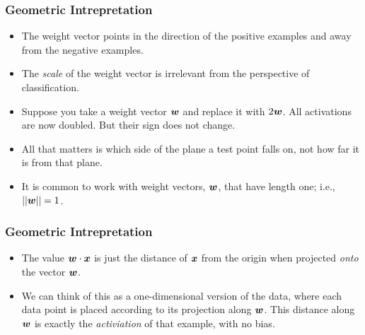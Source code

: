 \documentclass[trans]{beamer}
\begin{document}
\begin{frame}
  \frametitle{Geometric Intrepretation}
\begin{itemize}
\item
 The weight vector points in the direction of the positive examples
and away from the negative examples.
\item The \emph{scale} of the weight vector is
irrelevant from the perspective of classification. 
\item Suppose you take a
weight vector ${\boldsymbol{w}}$ and replace it with $2 {\boldsymbol{w}}$.  All activations are
now doubled.  But their sign does not change. 
\item All that matters is which side of the plane
a test point falls on, not how far it is from that plane. 
\item It is common to work with 
weight vectors, ${\boldsymbol{w}}$, that have length one; i.e., $\left\vert\left\vert {\boldsymbol{w}} \right\vert\right\vert = 1$.

\end{itemize}
\end{frame}

\begin{frame}
  \frametitle{Geometric Intrepretation}
\begin{itemize}
\item
The value ${\boldsymbol{w}} \cdot {\boldsymbol{x}}$
is just the distance of ${\boldsymbol{x}}$ from the origin when projected
\emph{onto} the vector ${\boldsymbol{w}}$.
\item We can think of this as a
one-dimensional version of the data, where each data point is placed
according to its projection along ${\boldsymbol{w}}$.  This distance along ${\boldsymbol{w}}$ is
exactly the \emph{activiation} of that example, with no bias.
\end{itemize}
\end{frame}
\end{document}
